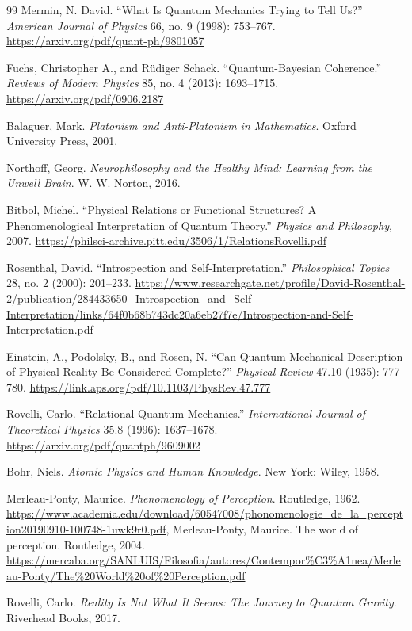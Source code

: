 \documentclass[11pt]{article}
\numberwithin{equation}{section} %
\begin{document}
\begin{thebibliography}{99}
Mermin, N. David. “What Is Quantum Mechanics Trying to Tell Us?” \textit{American Journal of Physics} 66, no. 9 (1998): 753–767. \url{https://arxiv.org/pdf/quant-ph/9801057}

Fuchs, Christopher A., and Rüdiger Schack. “Quantum-Bayesian Coherence.” \textit{Reviews of Modern Physics} 85, no. 4 (2013): 1693–1715. \url{https://arxiv.org/pdf/0906.2187}

Balaguer, Mark. \textit{Platonism and Anti-Platonism in Mathematics}. Oxford University Press, 2001.

Northoff, Georg. \textit{Neurophilosophy and the Healthy Mind: Learning from the Unwell Brain}. W. W. Norton, 2016.

Bitbol, Michel. “Physical Relations or Functional Structures? A Phenomenological Interpretation of Quantum Theory.” \textit{Physics and Philosophy}, 2007. \url{https://philsci-archive.pitt.edu/3506/1/RelationsRovelli.pdf}

Rosenthal, David. “Introspection and Self-Interpretation.” \textit{Philosophical Topics} 28, no. 2 (2000): 201–233. \url{https://www.researchgate.net/profile/David-Rosenthal-2/publication/284433650_Introspection_and_Self-Interpretation/links/64f0b68b743dc20a6eb27f7e/Introspection-and-Self-Interpretation.pdf}

Einstein, A., Podolsky, B., and Rosen, N. “Can Quantum-Mechanical Description of Physical Reality Be Considered Complete?” \textit{Physical Review} 47.10 (1935): 777–780. \url{https://link.aps.org/pdf/10.1103/PhysRev.47.777}

Rovelli, Carlo. “Relational Quantum Mechanics.” \textit{International Journal of Theoretical Physics} 35.8 (1996): 1637–1678. \url{https://arxiv.org/pdf/quantph/9609002}

Bohr, Niels. \textit{Atomic Physics and Human Knowledge}. New York: Wiley, 1958.

Merleau-Ponty, Maurice. \textit{Phenomenology of Perception}. Routledge, 1962. \url{https://www.academia.edu/download/60547008/phonomenologie_de_la_perception20190910-100748-1uwk9r0.pdf}, Merleau-Ponty, Maurice. The world of perception. Routledge, 2004. \url{https://mercaba.org/SANLUIS/Filosofia/autores/Contempor%C3%A1nea/Merleau-Ponty/The%20World%20of%20Perception.pdf}

Rovelli, Carlo. \textit{Reality Is Not What It Seems: The Journey to Quantum Gravity}. Riverhead Books, 2017.


\end{thebibliography}
\end{document}
